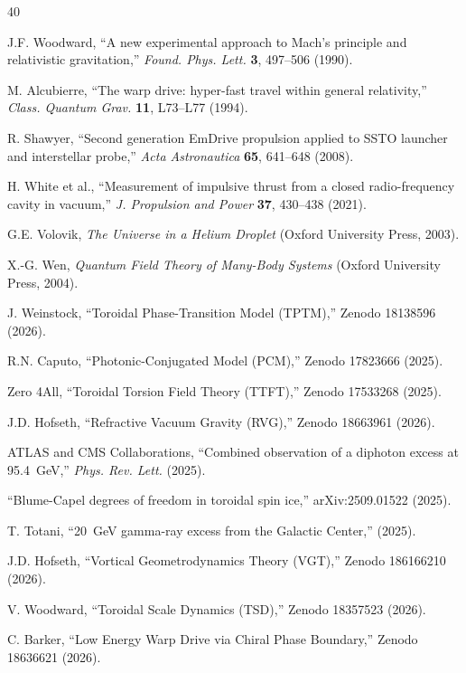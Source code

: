 \documentclass[preprint,12pt]{elsarticle}
\begin{document}
\begin{thebibliography}{40}

J.F. Woodward, ``A new experimental approach to Mach's principle and relativistic gravitation,'' \textit{Found. Phys. Lett.} \textbf{3}, 497--506 (1990).

M. Alcubierre, ``The warp drive: hyper-fast travel within general relativity,'' \textit{Class. Quantum Grav.} \textbf{11}, L73--L77 (1994).

R. Shawyer, ``Second generation EmDrive propulsion applied to SSTO launcher and interstellar probe,'' \textit{Acta Astronautica} \textbf{65}, 641--648 (2008).

H. White et al., ``Measurement of impulsive thrust from a closed radio-frequency cavity in vacuum,'' \textit{J. Propulsion and Power} \textbf{37}, 430--438 (2021).

G.E. Volovik, \textit{The Universe in a Helium Droplet} (Oxford University Press, 2003).

X.-G. Wen, \textit{Quantum Field Theory of Many-Body Systems} (Oxford University Press, 2004).

J. Weinstock, ``Toroidal Phase-Transition Model (TPTM),'' Zenodo 18138596 (2026).

R.N. Caputo, ``Photonic-Conjugated Model (PCM),'' Zenodo 17823666 (2025).

Zero 4All, ``Toroidal Torsion Field Theory (TTFT),'' Zenodo 17533268 (2025).

J.D. Hofseth, ``Refractive Vacuum Gravity (RVG),'' Zenodo 18663961 (2026).

ATLAS and CMS Collaborations, ``Combined observation of a diphoton excess at 95.4~GeV,'' \textit{Phys. Rev. Lett.} (2025).

``Blume-Capel degrees of freedom in toroidal spin ice,'' arXiv:2509.01522 (2025).

T. Totani, ``20~GeV gamma-ray excess from the Galactic Center,'' (2025).

J.D. Hofseth, ``Vortical Geometrodynamics Theory (VGT),'' Zenodo 186166210 (2026).

V. Woodward, ``Toroidal Scale Dynamics (TSD),'' Zenodo 18357523 (2026).

C. Barker, ``Low Energy Warp Drive via Chiral Phase Boundary,'' Zenodo 18636621 (2026).


\end{thebibliography}
\end{document}
